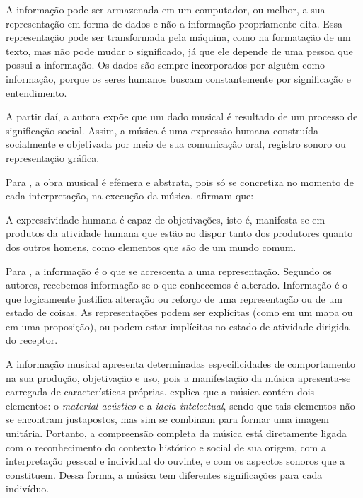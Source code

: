 A informação pode ser armazenada em um computador, ou melhor, a sua representação em forma de dados e não a informação propriamente dita. Essa representação pode ser transformada pela máquina, como na formatação de um texto, mas não pode mudar o significado, já que ele depende de uma pessoa que possui a informação. Os dados são sempre incorporados por alguém como informação, porque os seres humanos buscam constantemente por significação e entendimento.

A partir daí, a autora  expõe que um dado musical é resultado de um processo de significação social. Assim, a música é uma expressão humana construída socialmente e objetivada por meio de sua comunicação oral, registro sonoro ou representação gráfica.

Para , a obra musical é efêmera e abstrata, pois só se concretiza no momento de cada interpretação, na execução da música.  afirmam que:

\begin{citacao}
A expressividade humana é capaz de objetivações, isto é, manifesta-se em produtos da atividade humana que estão ao dispor tanto dos produtores quanto dos outros homens, como elementos que são de um mundo comum.
\end{citacao}

Para , a informação é o que se acrescenta a uma representação. Segundo os autores, recebemos informação se o que conhecemos é alterado. Informação é o que logicamente justifica alteração ou reforço de uma representação ou de um estado de coisas. As representações podem ser explícitas (como em um mapa ou em uma proposição), ou podem estar implícitas no estado de atividade dirigida do receptor.

A informação musical apresenta determinadas especificidades de comportamento na sua produção, objetivação e uso, pois a manifestação da música apresenta-se carregada de características próprias.  explica que a música contém dois elementos: o \textit{material acústico} e a \textit{ideia intelectual}, sendo que tais elementos não se encontram justapostos, mas sim se combinam para formar uma imagem unitária. Portanto, a compreensão completa da música está diretamente ligada com o reconhecimento do contexto histórico e social de sua origem, com a interpretação pessoal e individual do ouvinte, e com os aspectos sonoros que a constituem. Dessa forma, a música tem diferentes significações para cada indivíduo.

